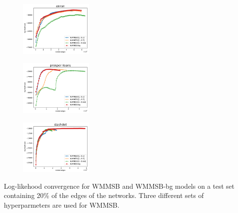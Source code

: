 \begin{subfigure}                                                                        
     \centering                                                                          
         \includegraphics[width=0.32\textwidth]{fig/enron_fig__entropy__}
\end{subfigure}
\begin{subfigure}
         \centering
      \includegraphics[width=0.32\textwidth]{fig/prosper-loans_fig__entropy__}
\end{subfigure}                                                             
\begin{subfigure}                                                           
         \centering                                                         
      \includegraphics[width=0.32\textwidth]{fig/slashdot_fig__entropy__}
\end{subfigure}                                                             
\caption{Log-likehood convergence for WMMSB and WMMSB-bg models on a test set containing 20\% of the edges of the networks. Three different sets of hyperparmeters are used for WMMSB.}

